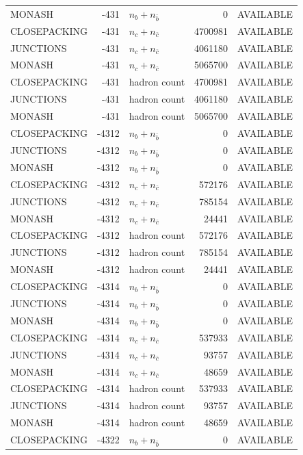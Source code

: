\begin{landscape}
\begin{longtable}{@{}lrlrl@{}}
MONASH & -431 & $n_b+n_{\bar b}$ & \num{0} & AVAILABLE \\
CLOSEPACKING & -431 & $n_c+n_{\bar c}$ & \num{4700981} & AVAILABLE \\
JUNCTIONS & -431 & $n_c+n_{\bar c}$ & \num{4061180} & AVAILABLE \\
MONASH & -431 & $n_c+n_{\bar c}$ & \num{5065700} & AVAILABLE \\
CLOSEPACKING & -431 & hadron count & \num{4700981} & AVAILABLE \\
JUNCTIONS & -431 & hadron count & \num{4061180} & AVAILABLE \\
MONASH & -431 & hadron count & \num{5065700} & AVAILABLE \\
CLOSEPACKING & -4312 & $n_b+n_{\bar b}$ & \num{0} & AVAILABLE \\
JUNCTIONS & -4312 & $n_b+n_{\bar b}$ & \num{0} & AVAILABLE \\
MONASH & -4312 & $n_b+n_{\bar b}$ & \num{0} & AVAILABLE \\
CLOSEPACKING & -4312 & $n_c+n_{\bar c}$ & \num{572176} & AVAILABLE \\
JUNCTIONS & -4312 & $n_c+n_{\bar c}$ & \num{785154} & AVAILABLE \\
MONASH & -4312 & $n_c+n_{\bar c}$ & \num{24441} & AVAILABLE \\
CLOSEPACKING & -4312 & hadron count & \num{572176} & AVAILABLE \\
JUNCTIONS & -4312 & hadron count & \num{785154} & AVAILABLE \\
MONASH & -4312 & hadron count & \num{24441} & AVAILABLE \\
CLOSEPACKING & -4314 & $n_b+n_{\bar b}$ & \num{0} & AVAILABLE \\
JUNCTIONS & -4314 & $n_b+n_{\bar b}$ & \num{0} & AVAILABLE \\
MONASH & -4314 & $n_b+n_{\bar b}$ & \num{0} & AVAILABLE \\
CLOSEPACKING & -4314 & $n_c+n_{\bar c}$ & \num{537933} & AVAILABLE \\
JUNCTIONS & -4314 & $n_c+n_{\bar c}$ & \num{93757} & AVAILABLE \\
MONASH & -4314 & $n_c+n_{\bar c}$ & \num{48659} & AVAILABLE \\
CLOSEPACKING & -4314 & hadron count & \num{537933} & AVAILABLE \\
JUNCTIONS & -4314 & hadron count & \num{93757} & AVAILABLE \\
MONASH & -4314 & hadron count & \num{48659} & AVAILABLE \\
CLOSEPACKING & -4322 & $n_b+n_{\bar b}$ & \num{0} & AVAILABLE \\

\end{longtable}
\end{landscape}
